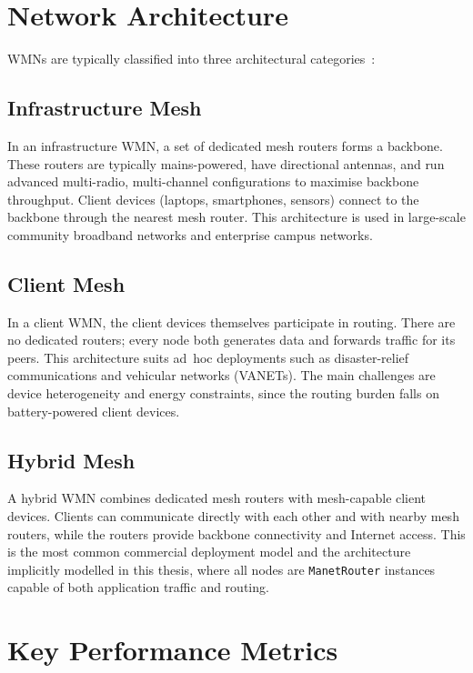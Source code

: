 \section{Network Architecture}

WMNs are typically classified into three architectural categories~\cite{akyildiz2005wmn,
bruno2005mesh}:

\subsection{Infrastructure Mesh}

In an infrastructure WMN, a set of dedicated mesh routers forms a backbone. These
routers are typically mains-powered, have directional antennas, and run advanced
multi-radio, multi-channel configurations to maximise backbone throughput. Client devices
(laptops, smartphones, sensors) connect to the backbone through the nearest mesh router.
This architecture is used in large-scale community broadband networks and enterprise
campus networks.

\subsection{Client Mesh}

In a client WMN, the client devices themselves participate in routing. There are no
dedicated routers; every node both generates data and forwards traffic for its peers.
This architecture suits ad~hoc deployments such as disaster-relief communications and
vehicular networks (VANETs). The main challenges are device heterogeneity and energy
constraints, since the routing burden falls on battery-powered client devices.

\subsection{Hybrid Mesh}

A hybrid WMN combines dedicated mesh routers with mesh-capable client devices. Clients
can communicate directly with each other and with nearby mesh routers, while the routers
provide backbone connectivity and Internet access. This is the most common commercial
deployment model and the architecture implicitly modelled in this thesis, where all nodes
are \texttt{ManetRouter} instances capable of both application traffic and routing.

\section{Key Performance Metrics}

